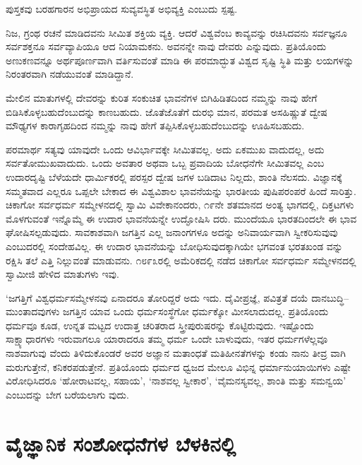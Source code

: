 ಪುಸ್ತಕವು ಬರಹಗಾರನ ಅಭಿಪ್ರಾಯದ ಸುವ್ಯವಸ್ಥಿತ ಅಭಿವ್ಯಕ್ತಿ ಎಂಬುದು ಸ್ಪಷ್ಟ.

ನಿಜ, ಗ್ರಂಥ ರಚನೆ ಮಾಡಿದವನು ಸೀಮಿತ ಶಕ್ತಿಯ ವ್ಯಕ್ತಿ. ಆದರೆ ವಿಶ್ವವೆಂಬ ಕಾವ್ಯವನ್ನು ರಚಿಸಿದವನು ಸರ್ವಜ್ಞನೂ ಸರ್ವಶಕ್ತನೂ ಸರ್ವವ್ಯಾಪಿಯೂ ಆದ ನಿಯಾಮಕನು. ಅವನನ್ನೇ ನಾವು ದೇವರು ಎನ್ನುವುದು. ಪ್ರತಿಯೊಂದು ಅಣುಕಣವನ್ನೂ ಅರ್ಥಪೂರ್ಣವಾಗಿ ವರ್ತಿಸುವಂತೆ ಮಾಡಿ ಈ ಪರಮಾದ್ಭುತ ವಿಶ್ವದ ಸೃಷ್ಟಿ ಸ್ಥಿತಿ ಮತ್ತು ಲಯಗಳನ್ನು ನಿರಂತರವಾಗಿ ನಡೆಯುವಂತೆ ಮಾಡಿದ್ದಾನೆ.

ಮೇಲಿನ ಮಾತುಗಳಲ್ಲಿ ದೇವರನ್ನು ಕುರಿತ ಸಂಕುಚಿತ ಭಾವನೆಗಳ ಬಿಗಿಹಿಡಿತದಿಂದ ನಮ್ಮನ್ನು ನಾವು ಹೇಗೆ ಬಿಡಿಸಿಕೊಳ್ಳಬಹುದೆಂಬುದನ್ನು ಕಾಣಬಹುದು. ಜೊತೆಜೊತೆಗೆ ದುರಭಿ ಮಾನ, ಪರಮತ ಅಸಹಿಷ್ಣುತೆ ದ್ವೇಷ ಮೌಢ್ಯಗಳ ಕಾರಾಗೃಹದಿಂದ ನಮ್ಮನ್ನು ನಾವು ಹೇಗೆ ತಪ್ಪಿಸಿಕೊಳ್ಳಬಹುದೆಂಬುದನ್ನು ಊಹಿಸಬಹುದು.

ಪರಮಾರ್ಥ ಸತ್ಯವು ಯಾವುದೇ ಒಂದು ಆವಿರ್ಭಾವಕ್ಕೇ ಸೀಮಿತವಲ್ಲ. ಅದು ಏಕಮುಖ ವಾದುದಲ್ಲ, ಅದು ಸರ್ವತೋಮುಖವಾದುದು. ಒಂದು ಅವತಾರ ಅಥವಾ ಒಬ್ಬ ಪ್ರವಾದಿಯ ಬೋಧನೆಗೇ ಸೀಮಿತವಲ್ಲ ಎಂಬ ಉದಾರದೃಷ್ಟಿ ಬೆಳೆಯದೇ ಧಾರ್ಮಿಕರಲ್ಲಿ ಪರಸ್ಪರ ದ್ವೇಷ ಜಗಳ ಬಡಿದಾಟ ನಿಲ್ಲದು, ಶಾಂತಿ ನೆಲಸದು. ವಿಜ್ಞಾನಕ್ಕೆ ಸಮ್ಮತವಾದ ಎಲ್ಲರೂ ಒಪ್ಪಲೇ ಬೇಕಾದ ಈ ವಿಶ್ವವಿಶಾಲ ಭಾವನೆಯನ್ನು ಭಾರತೀಯ ಪುಷಿಪರಂಪರೆ ಹಿಂದೆ ಸಾರಿತ್ತು. ಚಿಕಾಗೋ ಸರ್ವಧರ್ಮ ಸಮ್ಮೇಳನದಲ್ಲಿ ಸ್ವಾಮಿ ವಿವೇಕಾನಂದರು, ೧೯ನೇ ಶತಮಾನದ ಅಂತ್ಯ ಭಾಗದಲ್ಲಿ, ದಿಕ್ತಟಗಳು ಮೊಳಗುವಂತೆ ಇನ್ನೊಮ್ಮೆ ಈ ಉದಾರ ಭಾವನೆಯನ್ನೇ ಉದ್ಘೋಷಿಸಿ ದರು. ಮುಂದೆಯೂ ಭಾರತದಿಂದಲೇ ಈ ಭಾವ ಘೋಷಿಸಲ್ಪಡುವುದು. ಸಾವಕಾಶವಾಗಿ ಜಗತ್ತಿನ ಎಲ್ಲ ಜನಾಂಗಗಳೂ ಅದನ್ನು ಅನಿವಾರ್ಯವಾಗಿ ಸ್ವೀಕರಿಸುವುವು ಎಂಬುದರಲ್ಲಿ ಸಂದೇಹವಿಲ್ಲ. ಈ ಉದಾರ ಭಾವನೆಯನ್ನು ಬೋಧಿಸುವುದಕ್ಕಾಗಿಯೇ ಭಗವಂತ ಭರತಖಂಡ ವನ್ನು ರಕ್ಷಿಸಿ ತಲೆ ಎತ್ತಿ ನಿಲ್ಲುವಂತೆ ಮಾಡುವನು. ೧೮೯೩ರಲ್ಲಿ ಅಮೆರಿಕದಲ್ಲಿ ನಡೆದ ಚಿಕಾಗೋ ಸರ್ವಧರ್ಮ ಸಮ್ಮೇಳನದಲ್ಲಿ ಸ್ವಾಮೀಜಿ ಹೇಳಿದ ಮಾತುಗಳು ಇವು.

‘ಜಗತ್ತಿಗೆ ವಿಶ್ವಧರ್ಮಸಮ್ಮೇಳನವು ಏನಾದರೂ ತೋರಿದ್ದರೆ ಅದು ಇದು. ದೈವೀಪ್ರಜ್ಞೆ, ಪವಿತ್ರತೆ ದಯೆ ದಾನಬುದ್ಧಿ–ಮುಂತಾದವುಗಳು ಜಗತ್ತಿನ ಯಾವ ಒಂದು ಧರ್ಮಸಂಸ್ಥೆಗೋ ಧರ್ಮಕ್ಕೋ ಮೀಸಲಾದುದಲ್ಲ. ಪ್ರತಿಯೊಂದು ಧರ್ಮವೂ ಕೂಡ, ಉನ್ನತ ಮಟ್ಟದ ಉದಾತ್ತ ಚರಿತರಾದ ಸ್ತ್ರೀಪುರುಷರನ್ನು ಕೊಟ್ಟಿರುವುದು. ಇಷ್ಟೊಂದು ಸಾಕ್ಷ್ಯಾಧಾರಗಳು ಇರುವಾಗಲೂ ಯಾರಾದರೂ ತಮ್ಮ ಧರ್ಮ ಒಂದೇ ಬಾಳುವುದು, ಇತರ ಧರ್ಮಗಳೆಲ್ಲವೂ ನಾಶವಾಗುವು ವೆಂದು ತಿಳಿದುಕೊಂಡರೆ ಅವರ ಅಜ್ಞಾನ ಮತಾಂಧತೆ ಮತಿಹೀನತೆಗಳನ್ನು ಕಂಡು ನಾನು ತೀವ್ರ ವಾಗಿ ಮರುಗುತ್ತೇನೆ, ಕನಿಕರಪಡುತ್ತೇನೆ. ಪ್ರತಿಯೊಂದು ಧರ್ಮದ ಧ್ವಜದ ಮೇಲೂ ವಿಭಿನ್ನ ಧರ್ಮಾನುಯಾಯಿಗಳು ಎಷ್ಟೇ ವಿರೋಧಿಸಿದರೂ ‘ಹೋರಾಟವಲ್ಲ, ಸಹಾಯ’, ‘ನಾಶವಲ್ಲ ಸ್ವೀಕಾರ’, ‘ವೈಮನಸ್ಯವಲ್ಲ, ಶಾಂತಿ ಮತ್ತು ಸಮನ್ವಯ’ ಎಂಬುದನ್ನು ಬೇಗ ಬರೆಯಲಾಗು ವುದು.


\section{ವೈಜ್ಞಾನಿಕ ಸಂಶೋಧನೆಗಳ ಬೆಳಕಿನಲ್ಲಿ}

